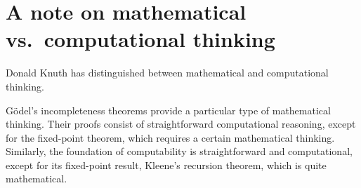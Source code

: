 \documentclass[twoside,twocolumn,a4paper,11pt]{article}
\theoremstyle{definition}
\begin{document}


\section{A note on mathematical vs.\ computational thinking}
\label{sec:fixNote}
Donald Knuth has distinguished
between 
mathematical and computational thinking.\cite{knuthInt}

G\"{o}del's incompleteness theorems
provide a particular type of mathematical thinking.
Their proofs 
consist
of
straightforward computational reasoning,
except for the fixed-point theorem,
which 
requires a certain mathematical thinking.
Similarly, the foundation of computability is straightforward and computational, 
except for its fixed-point result, Kleene's recursion theorem,
which is quite mathematical.\cite{fra13,yan03}


\end{document}
